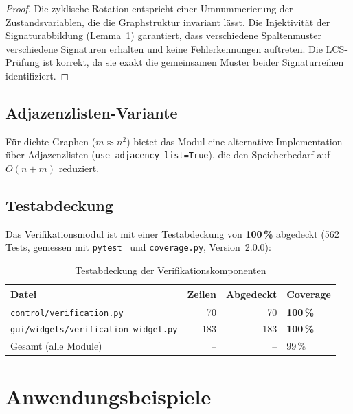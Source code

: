 \documentclass[a4paper,12pt]{article}
\theoremstyle{definition}
\begin{document}
\begin{proof}
Die zyklische Rotation entspricht einer Umnummerierung der Zustandsvariablen,
die die Graphstruktur invariant lässt. Die Injektivität der Signaturabbildung
(Lemma~1) garantiert, dass verschiedene Spaltenmuster verschiedene Signaturen
erhalten und keine Fehlerkennungen auftreten. Die LCS-Prüfung ist korrekt,
da sie exakt die gemeinsamen Muster beider Signaturreihen identifiziert.
\end{proof}

\subsection{Adjazenzlisten-Variante}

Für dichte Graphen ($m \approx n^2$) bietet das Modul eine alternative
Implementation über Adjazenzlisten (\texttt{use\_adjacency\_list=True}),
die den Speicherbedarf auf $O(n + m)$ reduziert.

\subsection{Testabdeckung}

Das Verifikationsmodul ist mit einer Testabdeckung von \textbf{100\,\%}
abgedeckt (562 Tests, gemessen mit \texttt{pytest}~\cite{pytest} und
\texttt{coverage.py}, Version~2.0.0):

\begin{table}[h]
\centering
\begin{tabular}{@{}lrrl@{}}
\toprule
\textbf{Datei} & \textbf{Zeilen} & \textbf{Abgedeckt} & \textbf{Coverage} \\
\midrule
\texttt{control/verification.py}        & 70  & 70  & \textbf{100\,\%} \\
\texttt{gui/widgets/verification\_widget.py} & 183 & 183 & \textbf{100\,\%} \\
\midrule
Gesamt (alle Module) & -- & -- & 99\,\% \\
\bottomrule
\end{tabular}
\caption{Testabdeckung der Verifikationskomponenten}
\end{table}

\section{Anwendungsbeispiele}
\label{sec:beispiele}
\end{document}
